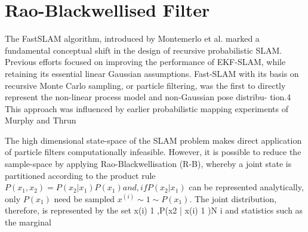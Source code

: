 \documentclass[12pt]{article}
\begin{document}
\section{Rao-Blackwellised Filter}
The FastSLAM algorithm, introduced by Montemerlo et al.  marked a fundamental conceptual shift in the design of recursive probabilistic SLAM. Previous efforts focused on improving the performance of EKF-SLAM, while retaining its essential linear Gaussian assumptions. Fast-SLAM with its basis on recursive Monte Carlo sampling, or particle filtering, was the first to directly represent the non-linear process model and non-Gaussian pose distribu- tion.4 This approach was influenced by earlier probabilistic mapping experiments of Murphy  and Thrun
\par The high dimensional state-space of the SLAM problem makes direct application of particle filters computationally infeasible. However, it is possible to reduce the sample-space by applying Rao-Blackwellisation (R-B), whereby a joint state is partitioned according to the product rule $P(x_1,x_2) = P(x_2 | x_1)P(x_1) and, if P(x_2 | x_1)$ can be represented analytically, only $P(x_1)$ need be sampled $x^{(i)}\sim 1 ∼ P(x_1)$. The joint distribution, therefore, is represented by the set {x(i)
1 ,P(x2 | x(i)
1 )}N i and statistics
such as the marginal
\end{document}
